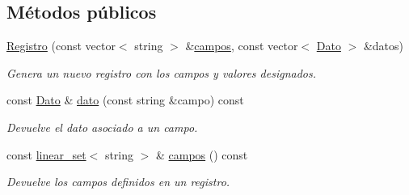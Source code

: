 \subsection*{Métodos públicos}
\begin{DoxyCompactItemize}
\item 
\hyperlink{classRegistro_af3717314d0e658a463ffd8ac5b073441}{Registro} (const vector$<$ string $>$ \&\hyperlink{classRegistro_af082664a69c70eb5d29dcad6522242fc}{campos}, const vector$<$ \hyperlink{classDato}{Dato} $>$ \&datos)
\begin{DoxyCompactList}\small\item\em Genera un nuevo registro con los campos y valores designados. \end{DoxyCompactList}\item 
const \hyperlink{classDato}{Dato} \& \hyperlink{classRegistro_a5191c0af2f375525601819cfbb477287}{dato} (const string \&campo) const 
\begin{DoxyCompactList}\small\item\em Devuelve el dato asociado a un campo. \end{DoxyCompactList}\item 
const \hyperlink{classlinear__set}{linear\-\_\-set}$<$ string $>$ \& \hyperlink{classRegistro_af082664a69c70eb5d29dcad6522242fc}{campos} () const 
\begin{DoxyCompactList}\small\item\em Devuelve los campos definidos en un registro. \end{DoxyCompactList}\end{DoxyCompactItemize}
